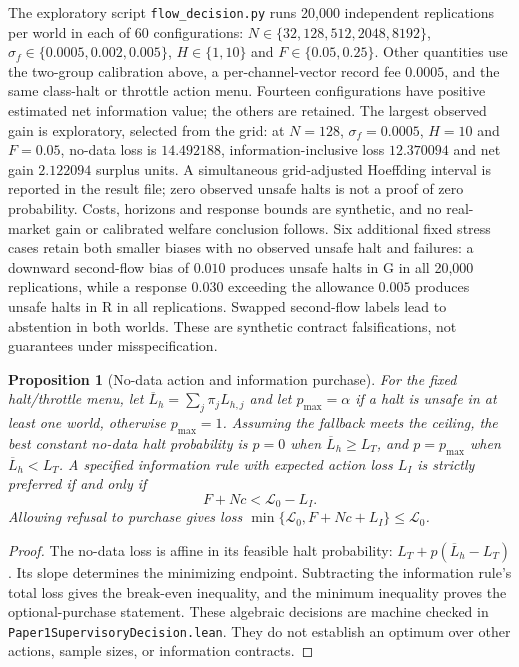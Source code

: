 \documentclass[12pt]{article}
\newtheorem{proposition}[theorem]{Proposition}
\theoremstyle{definition}
\theoremstyle{remark}
\begin{document}
The exploratory script
\nolinkurl{flow_decision.py}
runs 20,000 independent replications per world in each of 60 configurations: $N\in\{32,\allowbreak128,\allowbreak512,\allowbreak2048,\allowbreak8192\}$, $\sigma_f\in\{0.0005,0.002,0.005\}$, $H\in\{1,10\}$ and $F\in\{0.05,0.25\}$. Other quantities use the two-group calibration above, a per-channel-vector record fee $0.0005$, and the same class-halt or throttle action menu. Fourteen configurations have positive estimated net information value; the others are retained. The largest observed gain is exploratory, selected from the grid: at $N=128$, $\sigma_f=0.0005$, $H=10$ and $F=0.05$, no-data loss is $14.492188$, information-inclusive loss $12.370094$ and net gain $2.122094$ surplus units. A simultaneous grid-adjusted Hoeffding interval is reported in the result file; zero observed unsafe halts is not a proof of zero probability. Costs, horizons and response bounds are synthetic, and no real-market gain or calibrated welfare conclusion follows. Six additional fixed stress cases retain both smaller biases with no observed unsafe halt and failures: a downward second-flow bias of $0.010$ produces unsafe halts in G in all 20,000 replications, while a response $0.030$ exceeding the allowance $0.005$ produces unsafe halts in R in all replications. Swapped second-flow labels lead to abstention in both worlds. These are synthetic contract falsifications, not guarantees under misspecification.

\begin{proposition}[No-data action and information purchase]\label{prop:priced_decision}
For the fixed halt/throttle menu, let $\overline L_h=\sum_j\pi_jL_{h,j}$ and let $p_{\max}=\alpha$ if a halt is unsafe in at least one world, otherwise $p_{\max}=1$. Assuming the fallback meets the ceiling, the best constant no-data halt probability is $p=0$ when $\overline L_h\ge L_T$, and $p=p_{\max}$ when $\overline L_h<L_T$. A specified information rule with expected action loss $L_I$ is strictly preferred if and only if
\[
 F+Nc<\mathcal L_0-L_I.
\]
Allowing refusal to purchase gives loss $\min\{\mathcal L_0,F+Nc+L_I\}\le\mathcal L_0$.
\end{proposition}
\begin{proof}
The no-data loss is affine in its feasible halt probability: $L_T+p(\overline L_h-L_T)$. Its slope determines the minimizing endpoint. Subtracting the information rule's total loss gives the break-even inequality, and the minimum inequality proves the optional-purchase statement. These algebraic decisions are machine checked in \nolinkurl{Paper1SupervisoryDecision.lean}. They do not establish an optimum over other actions, sample sizes, or information contracts.
\end{proof}
\end{document}
